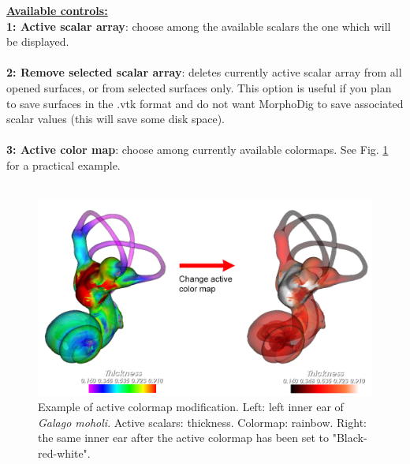 \noindent
\textbf{\underline{Available controls:}}\\
\textbf{1: Active scalar array}: choose among the available scalars the one which will be displayed.\\\\
\noindent
\textbf{2: Remove selected scalar array}: deletes currently active scalar array from all opened surfaces, or  from selected surfaces only. This option is useful if you plan to save surfaces in the .vtk format and do not want MorphoDig to save associated scalar values (this will save some disk space).\\\\
\noindent
\textbf{3: Active color map}: choose among currently available colormaps. See Fig. \ref{change_active_color_map} for a practical example. \\\\

\begin{figure}
  \centering
  \includegraphics[scale=0.38]{images/11/change_active_color_map.png} 
	\caption{
Example of active colormap modification.  Left: left inner ear of \textit{Galago moholi}. Active scalars: thickness. Colormap: rainbow. Right: the same inner ear after the active colormap has been set to "Black-red-white".}
\label{change_active_color_map}
 \end{figure}


